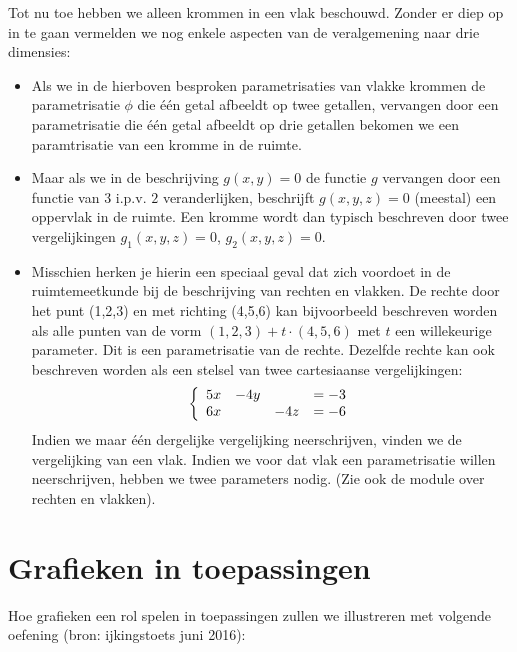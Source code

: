 Tot nu toe hebben we alleen krommen in een vlak beschouwd. Zonder er diep
op in te gaan vermelden we nog enkele aspecten van de veralgemening
naar drie dimensies:
\begin{itemize}
\item Als we in de hierboven besproken parametrisaties
van vlakke krommen de parametrisatie $\phi$ die \'e\'en getal afbeeldt
op twee getallen, vervangen door een parametrisatie die \'e\'en getal
afbeeldt op drie getallen bekomen we een paramtrisatie van een
kromme in de ruimte.
\item Maar als we in de beschrijving $g(x,y)=0$ de functie $g$
  vervangen door een functie van $3$ i.p.v. $2$ veranderlijken,
  beschrijft $g(x,y,z)=0$ (meestal) een oppervlak in de ruimte. Een
  kromme wordt dan typisch beschreven door twee vergelijkingen
  $g_1(x,y,z)=0$, $g_2(x,y,z)=0$.
\item Misschien herken je hierin een
  speciaal geval dat zich voordoet in de ruimtemeetkunde bij de
  beschrijving van rechten en vlakken.  De rechte door het punt
  (1,2,3) en met richting (4,5,6) kan bijvoorbeeld
  beschreven worden als alle punten van de vorm
  $(1,2,3)+t\cdot(4,5,6)$ met $t$ een willekeurige
  parameter. Dit is een parametrisatie van de rechte. Dezelfde
  rechte kan ook beschreven worden als een stelsel van twee cartesiaanse vergelijkingen:
\[
\left\{\ba{llll} 5 x & -4 y &  & = -3 \\
                 6 x  &      & - 4 z &=-6
\ea\right.
\]
Indien we maar \'e\'en dergelijke vergelijking neerschrijven, vinden
we de vergelijking van een vlak. Indien we voor dat vlak een
parametrisatie willen neerschrijven, hebben we twee parameters
nodig. (Zie ook de module over rechten en vlakken).

\end{itemize}

\section{Grafieken in toepassingen}
Hoe grafieken een rol spelen in toepassingen zullen we illustreren met volgende oefening (bron: ijkingstoets juni 2016):

